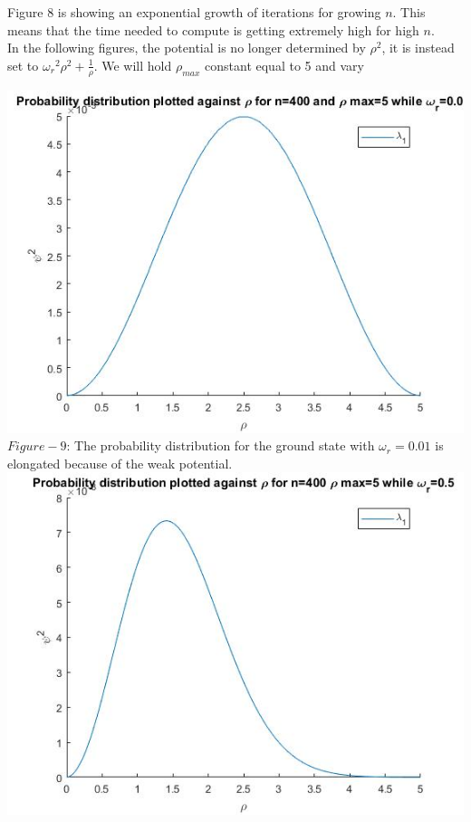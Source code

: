 \documentclass[10pt,a4paper]{article}
\begin{document}
\noindent Figure 8 is showing an exponential growth of iterations for growing $n$. This means that the time needed to compute is getting extremely high for high $n$.\\

\noindent In the following figures, the potential is no longer determined by $\rho^2$, it is instead set to ${\omega_r}^2\rho^2 + \frac{1}{\rho}$. We will hold $\rho_{max}$ constant equal to 5 and vary 

\begin{center}
\includegraphics[scale=0.6]{eigomg0011.jpg}
$Figure-9$: The probability distribution for the ground state with $\omega_r=0.01$ is elongated because of the weak potential.   
\includegraphics[scale=0.6]{eigomg055.jpg}

\end{center}
\end{document}
